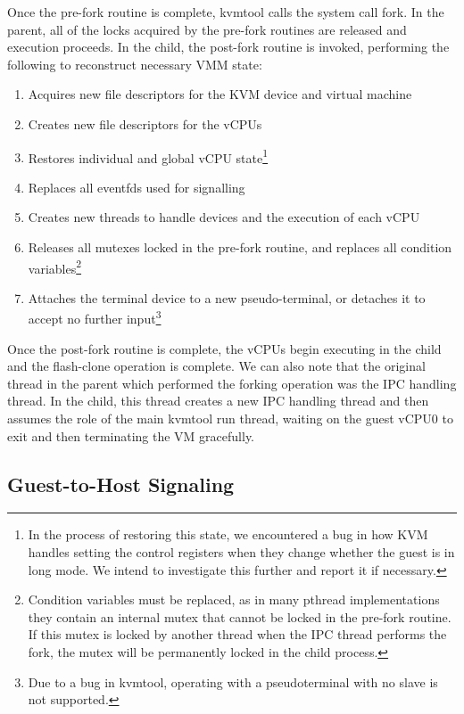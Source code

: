 Once the pre-fork routine is complete, kvmtool calls the system call fork. In
the parent, all of the locks acquired by the pre-fork routines are released and
execution proceeds. In the child, the post-fork routine is invoked, performing
the following to reconstruct necessary VMM state:

\begin{enumerate}
\item Acquires new file descriptors for the KVM device and virtual machine
\item Creates new file descriptors for the vCPUs
\item Restores individual and global vCPU state\footnote{In the process of
restoring this state, we encountered a bug in how KVM handles setting the
control registers when they change whether the guest is in long mode. We intend
to investigate this further and report it if necessary.}
\item Replaces all eventfds used for signalling
\item Creates new threads to handle devices and the execution of each vCPU
\item Releases all mutexes locked in the pre-fork routine, and replaces all
condition variables\footnote{Condition variables must be replaced, as in many
pthread implementations they contain an internal mutex that cannot be locked in
the pre-fork routine. If this mutex is locked by another thread when the IPC
thread performs the fork, the mutex will be permanently locked in the child
process.}
\item Attaches the terminal device to a new pseudo-terminal, or detaches it to
accept no further input\footnote{Due to a bug in kvmtool, operating with a
pseudoterminal with no slave is not supported.}
\end{enumerate}

Once the post-fork routine is complete, the vCPUs begin executing in the child
and the flash-clone operation is complete. We can also note that the original
thread in the parent which performed the forking operation was the IPC handling
thread. In the child, this thread creates a new IPC handling thread and then
assumes the role of the main kvmtool run thread, waiting on the guest vCPU0 to
exit and then terminating the VM gracefully.

\subsection{Guest-to-Host Signaling}

